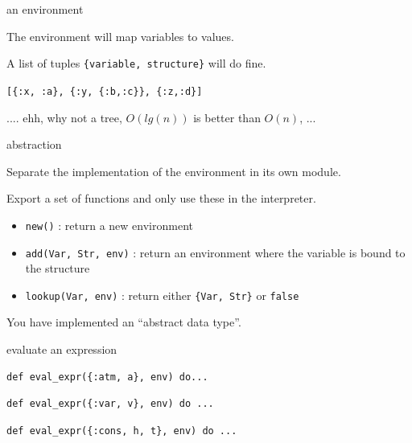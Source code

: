 \begin{frame}[fragile]{an environment}

The environment will map variables to values.

\pause\vspace{20pt}
A list of tuples \verb+{variable, structure}+ will do fine.

\pause\vspace{20pt}
\hspace{40pt}\verb+[{:x, :a}, {:y, {:b,:c}}, {:z,:d}]+

\pause\vspace{20pt}
.... ehh, why not a tree, $O(lg(n))$ is better than $O(n)$, ... 

\end{frame}

\begin{frame}[fragile]{abstraction}

Separate the implementation of the environment in its own module.

\pause\vspace{20pt}Export a set of functions and only use these in the interpreter.


\begin{itemize}
  \pause\item \verb+new()+ : return a new environment
  \pause\item \verb+add(Var, Str, env)+ : return an environment where the variable is bound to the structure
  \pause\item \verb+lookup(Var, env)+ : return either \verb+{Var, Str}+ or \verb+false+ 
\end{itemize}


\pause\vspace{20pt}You have implemented an ``abstract data type''.

\end{frame}

\begin{frame}[fragile]{evaluate an expression}

\begin{verbatim}
def eval_expr({:atm, a}, env) do...
\end{verbatim}
\begin{verbatim}
def eval_expr({:var, v}, env) do ...
\end{verbatim}
\begin{verbatim}
def eval_expr({:cons, h, t}, env) do ...
\end{verbatim}

\end{frame}


